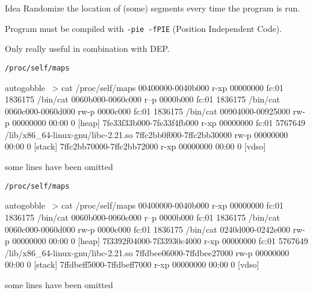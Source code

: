 \documentclass[beamer]{uibk}
\begin{document}
\begin{frame}{Idea}
    Randomize the location of (some) segments every time the program is run.
    \medskip

    Program must be compiled with \texttt{-pie -fPIE} (Position Independent
    Code).
    \medskip

    Only really useful in combination with DEP.
\end{frame}

\begin{frame}[fragile]{\texttt{/proc/self/maps}}
    \begin{pre*}{autogobble}
        ~> cat /proc/self/maps
        00400000-0040b000 r-xp 00000000 fc:01 1836175                            /bin/cat
        0060b000-0060c000 r--p 0000b000 fc:01 1836175                            /bin/cat
        0060c000-0060d000 rw-p 0000c000 fc:01 1836175                            /bin/cat
        00904000-00925000 rw-p 00000000 00:00 0                                  [heap]
        7fe33f33b000-7fe33f4fb000 r-xp 00000000 fc:01 5767649                    /lib/x86_64-linux-gnu/libc-2.21.so
        7ffc2bb0f000-7ffc2bb30000 rw-p 00000000 00:00 0                          [stack]
        7ffc2bb70000-7ffc2bb72000 r-xp 00000000 00:00 0                          [vdso]
    \end{pre*}
    \bigskip
    some lines have been omitted
\end{frame}
\begin{frame}[fragile]{\texttt{/proc/self/maps}}
    \begin{pre*}{autogobble}
        ~> cat /proc/self/maps
        00400000-0040b000 r-xp 00000000 fc:01 1836175                            /bin/cat
        0060b000-0060c000 r--p 0000b000 fc:01 1836175                            /bin/cat
        0060c000-0060d000 rw-p 0000c000 fc:01 1836175                            /bin/cat
        0240d000-0242e000 rw-p 00000000 00:00 0                                  [heap]
        7f3392f04000-7f33930c4000 r-xp 00000000 fc:01 5767649                    /lib/x86_64-linux-gnu/libc-2.21.so
        7ffdbee06000-7ffdbee27000 rw-p 00000000 00:00 0                          [stack]
        7ffdbeff5000-7ffdbeff7000 r-xp 00000000 00:00 0                          [vdso]
    \end{pre*}
    \bigskip
    some lines have been omitted
\end{frame}
\end{document}
